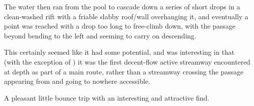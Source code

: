 The water then ran from the pool to cascade down a series of short drops
in a clean-washed rift with a friable slabby roof/wall overhanging it,
and eventually a point was reached with a drop too long to free-climb
down, with the passage beyond bending to the left and seeming to carry
on descending.

This certainly seemed like it had some potential, and was interesting in
that (with the exception of ) it was the first
decent-flow active streamway encountered at depth as part of a main
route, rather than a streamway crossing the passage appearing from and
going to nowhere accessible.

A pleasant little bounce trip with an interesting and attractive find.






